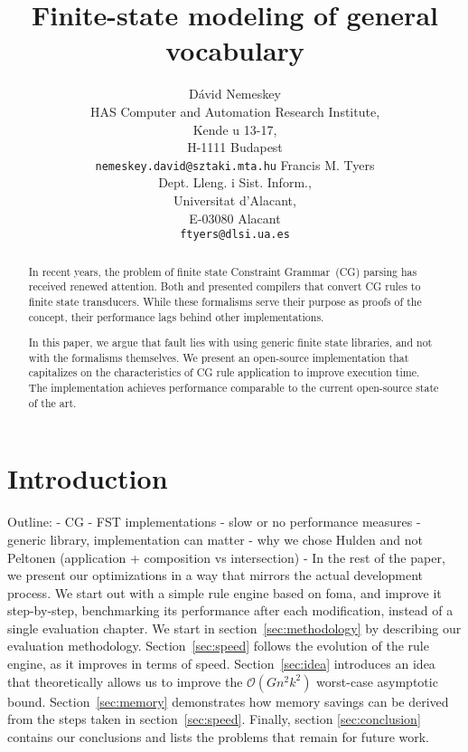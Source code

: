 \documentclass{article}
\title{Finite-state modeling of general vocabulary}
\author{D\'avid Nemeskey\\
 HAS Computer and Automation Research Institute, \\
   Kende u 13-17, \\
   H-1111 Budapest\\
 {\tt nemeskey.david@sztaki.mta.hu}
\And
Francis M. Tyers\\
Dept. Lleng. i Sist. Inform.,\\
Universitat d'Alacant,\\
E-03080 Alacant\\
{\tt ftyers@dlsi.ua.es}}
\date{}
\begin{document}
\maketitle\vspace*{-10mm}

\begin{abstract}
  In recent years, the problem of finite state Constraint Grammar~(CG) parsing has
  received renewed attention. Both  and
   presented compilers that convert CG rules to finite
  state transducers. While these formalisms serve their purpose as proofs of the
  concept, their performance lags behind other implementations.  %
  
  In this paper, we argue that fault lies with using generic finite state
  libraries, and not with the formalisms themselves. We present an open-source
  implementation that capitalizes on the characteristics of CG rule
  application to improve execution time. The implementation achieves performance
  comparable to the current open-source state of the art.
\end{abstract}

\section{Introduction}
Outline:
- CG
- FST implementations
- slow or no performance measures
- generic library, implementation can matter
- why we chose Hulden and not Peltonen (application + composition vs intersection)
- 
In the rest of the paper, we present our optimizations in a way that mirrors the
actual development process. We start out with a simple rule engine based on
foma, and improve it step-by-step, benchmarking its performance after each
modification, instead of a single evaluation chapter. We start in
section~\ref{sec:methodology} by describing our evaluation methodology.
Section~\ref{sec:speed} follows the evolution of the rule engine, as it improves
in terms of speed. Section~\ref{sec:idea} introduces an idea that theoretically
allows us to improve the $\mathcal{O}(Gn^2k^2)$ worst-case asymptotic bound.
Section~\ref{sec:memory} demonstrates how memory savings can be derived from the
steps taken in section~\ref{sec:speed}. Finally, section \ref{sec:conclusion}
contains our conclusions and lists the problems that remain for future work.
\end{document}
